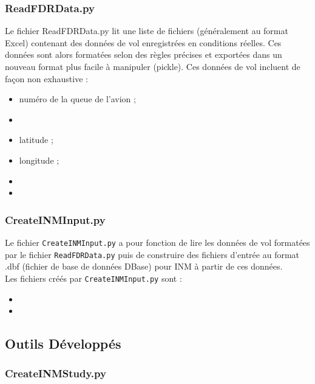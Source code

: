 \documentclass[a4paper,12pt,twoside]{article}
\newcommand{\code}[1]{\texttt{#1}}
\begin{document}
    \subsubsection*{ReadFDRData.py}
    Le fichier ReadFDRData.py lit une liste de fichiers (généralement au format Excel) contenant des données de vol enregistrées en conditions réelles. Ces données sont alors formatées selon des règles précises et exportées dans un nouveau format plus facile à manipuler (pickle). Ces données de vol incluent de façon non exhaustive :
    \begin{itemize}
        \renewcommand{\labelitemi}{$\bullet$}
        \item numéro de la queue de l'avion ;
        \item 
        \item latitude ;
        \item longitude ;
        \item 
        \item 
    \end{itemize}
	\subsubsection*{CreateINMInput.py}
    Le fichier \code{CreateINMInput.py} a pour fonction de lire les données de vol formatées par le fichier \code{ReadFDRData.py} puis de construire des fichiers d'entrée au format .dbf (fichier de base de données DBase) pour INM à partir de ces données.\\
    Les fichiers créés par \code{CreateINMInput.py} sont :
    \begin{itemize}
        \item 
        \item 
    \end{itemize}
    
    \subsection{Outils Développés}
    \subsubsection*{CreateINMStudy.py}
\end{document}
